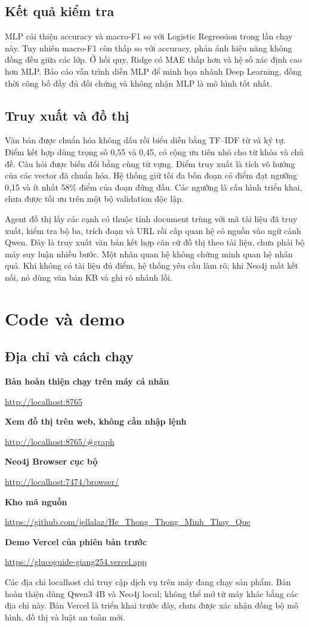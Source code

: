 \section{Kết quả kiểm tra}

MLP cải thiện accuracy và macro-F1 so với Logistic Regression trong lần chạy này. Tuy nhiên macro-F1 còn thấp so với accuracy, phản ánh hiệu năng không đồng đều giữa các lớp. Ở hồi quy, Ridge có MAE thấp hơn và hệ số xác định cao hơn MLP. Báo cáo vẫn trình diễn MLP để minh họa nhánh Deep Learning, đồng thời công bố đầy đủ đối chứng và không nhận MLP là mô hình tốt nhất.
\section{Truy xuất và đồ thị}
Văn bản được chuẩn hóa không dấu rồi biểu diễn bằng TF--IDF từ và ký tự. Điểm kết hợp dùng trọng số 0,55 và 0,45, có cộng ưu tiên nhỏ cho từ khóa và chủ đề. Câu hỏi được biến đổi bằng cùng từ vựng. Điểm truy xuất là tích vô hướng của các vector đã chuẩn hóa. Hệ thống giữ tối đa bốn đoạn có điểm đạt ngưỡng 0,15 và ít nhất 58\% điểm của đoạn đứng đầu. Các ngưỡng là cấu hình triển khai, chưa được tối ưu trên một bộ validation độc lập.

Agent đồ thị lấy các cạnh có thuộc tính document trùng với mã tài liệu đã truy xuất, kiểm tra bộ ba, trích đoạn và URL rồi cấp quan hệ có nguồn vào ngữ cảnh Qwen. Đây là truy xuất văn bản kết hợp căn cứ đồ thị theo tài liệu, chưa phải bộ máy suy luận nhiều bước. Một nhãn quan hệ không chứng minh quan hệ nhân quả. Khi không có tài liệu đủ điểm, hệ thống yêu cầu làm rõ; khi Neo4j mất kết nối, nó dùng văn bản KB và ghi rõ nhánh lỗi.


\chapter{Code và demo}
\section{Địa chỉ và cách chạy}
\noindent\textbf{Bản hoàn thiện chạy trên máy cá nhân}\par
\noindent\url{http://localhost:8765}\par\medskip
\noindent\textbf{Xem đồ thị trên web, không cần nhập lệnh}\par
\noindent\url{http://localhost:8765/\#graph}\par\medskip
\noindent\textbf{Neo4j Browser cục bộ}\par
\noindent\url{http://localhost:7474/browser/}\par\medskip
\noindent\textbf{Kho mã nguồn}\par
\noindent\url{https://github.com/jellalaz/He_Thong_Thong_Minh_Thay_Que}\par\medskip
\noindent\textbf{Demo Vercel của phiên bản trước}\par
\noindent\url{https://glucoguide-giang254.vercel.app}\par\medskip
Các địa chỉ localhost chỉ truy cập dịch vụ trên máy đang chạy sản phẩm. Bản hoàn thiện dùng Qwen3 4B và Neo4j local; không thể mở từ máy khác bằng các địa chỉ này. Bản Vercel là triển khai trước đây, chưa được xác nhận đồng bộ mô hình, đồ thị và luật an toàn mới.


